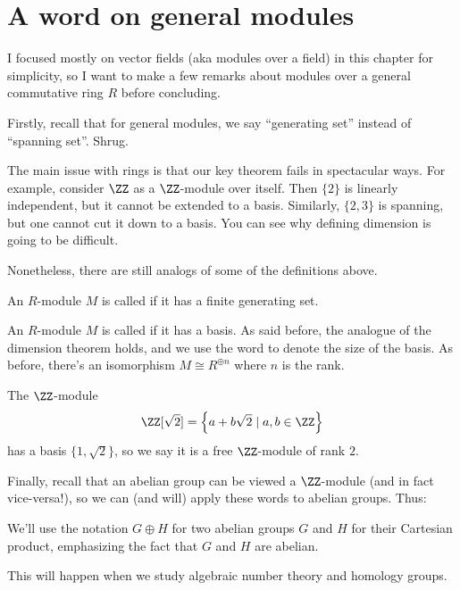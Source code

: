 \section{A word on general modules}
I focused mostly on vector fields (aka modules over a field) in this chapter
for simplicity, so I want to make a few remarks about
modules over a general commutative ring $R$ before concluding.

Firstly, recall that for general modules,
we say ``generating set'' instead of ``spanning set''.
Shrug.

The main issue with rings is that our key theorem 
fails in spectacular ways.
For example, consider $\ZZ$ as a $\ZZ$-module over itself.
Then $\{2\}$ is linearly independent, but it cannot be extended to a basis.
Similarly, $\{2,3\}$ is spanning, but one cannot cut it down to a basis.
You can see why defining dimension is going to be difficult.

Nonetheless, there are still analogs of some of the definitions above.
\begin{definition}
	An $R$-module $M$ is called  if it has a finite generating set.
\end{definition}
\begin{definition}
	An $R$-module $M$ is called  if it has a basis.
	As said before, the analogue of the dimension theorem holds,
	and we use the word  to denote the size of the basis.
	As before, there's an isomorphism $M \cong R^{\oplus n}$ where $n$ is the rank.
\end{definition}
\begin{example}
	The $\ZZ$-module
	\[ \ZZ[\sqrt2] = \left\{ a + b\sqrt 2 \mid a,b \in \ZZ \right\} \]
	has a basis $\{1, \sqrt 2\}$, so we say it is
	a free $\ZZ$-module of rank $2$.
\end{example}

Finally, recall that an abelian group can be viewed a $\ZZ$-module
(and in fact vice-versa!), so we can (and will) apply these words to abelian groups.
Thus:
\begin{abuse}
We'll use the notation $G \oplus H$ for two abelian groups $G$ and $H$
for their Cartesian product, emphasizing the fact that $G$ and $H$ are abelian.
\end{abuse}
This will happen when we study algebraic number theory and homology groups.

